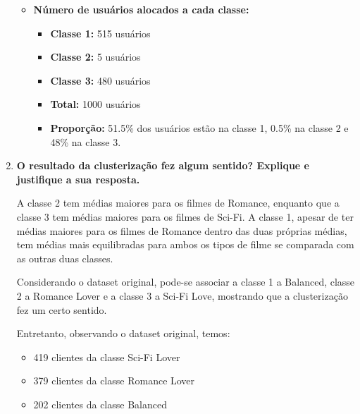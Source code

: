 \begin{enumerate}
\begin{tcolorbox}[title=Resposta:]
\begin{itemize}
        \end{itemize}
        \end{tcolorbox}

        \begin{tcolorbox}[title=Resposta (continuação):]
        \begin{itemize}

        \item \textbf{Número de usuários alocados a cada classe:}
        \begin{itemize}
            \item \textbf{Classe 1:}  515 usuários
            \item \textbf{Classe 2:}  5 usuários
            \item \textbf{Classe 3:}  480 usuários
            \item \textbf{Total:} 1000 usuários
            \item \textbf{Proporção:} 51.5\% dos usuários estão na classe 1, 0.5\% na classe 2 e 48\% na classe 3.
        \end{itemize}
        \end{itemize}
        

    \end{tcolorbox}
    \item \textbf{O resultado da clusterização fez algum sentido? Explique e justifique a sua resposta.}
    \begin{tcolorbox}[title=Resposta:]
        A classe 2 tem médias maiores para os filmes de Romance, enquanto que a classe 3 tem médias maiores para os filmes de Sci-Fi. A classe 1, apesar de ter médias maiores para os filmes de Romance dentro das duas próprias médias, tem médias mais equilibradas para ambos os tipos de filme se comparada com as outras duas classes. 

        Considerando o dataset original, pode-se associar a classe 1 a Balanced, classe 2 a Romance Lover e a classe 3 a Sci-Fi Love, mostrando que a clusterização fez um certo sentido.

        Entretanto, observando o dataset original, temos:
        \begin{itemize}
            \item 419 clientes da classe Sci-Fi Lover
            \item 379 clientes da classe Romance Lover
            \item 202 clientes da classe Balanced
        \end{itemize}


\end{tcolorbox}
\end{enumerate}
